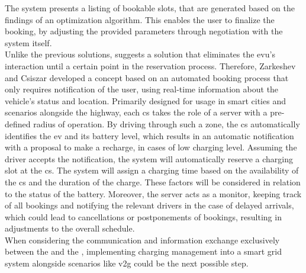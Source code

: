 The system presents a listing of bookable slots, that are generated based on the findings of an optimization algorithm. This enables the user to finalize the booking, by adjusting the provided parameters through negotiation with the system itself. \\
\noindent Unlike the previous solutions, \cite{zarkeshev_charging_2018} suggests a solution that eliminates the \acrshort{evu}'s interaction until a certain point in the reservation process.
Therefore, Zarkeshev and Csiszar developed a concept based on an automated booking process that only requires notification of the user, using real-time information about the vehicle's status and location.
Primarily designed for usage in smart cities and scenarios alongside the highway, each \acrshort{cs} takes the role of a server with a pre-defined radius of operation. By driving through such a zone, the \acrshort{cs} automatically identifies the \acrshort{ev} and its battery level, which results in an automatic notification with a proposal to make a recharge, in cases of low charging level. 
Assuming the driver accepts the notification, the system will automatically reserve a charging slot at the \acrshort{cs}. The system will assign a charging time based on the availability of the \acrshort{cs} and the duration of the charge. These factors will be considered in relation to the status of the battery.
Moreover, the server acts as a monitor, keeping track of all bookings and notifying the relevant drivers in the case of delayed arrivals, which could lead to cancellations or postponements of bookings, resulting in adjustments to the overall schedule. \\
\noindent When considering the communication and information exchange exclusively between the  and the , implementing charging management into a smart grid system alongside scenarios like \acrshort{v2g} could be the next possible step. 
